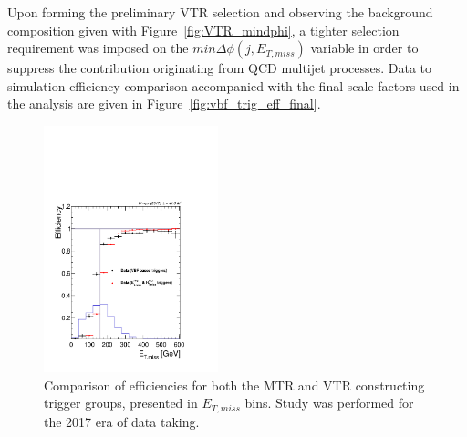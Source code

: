 \hspace{10pt} Upon forming the preliminary VTR selection and observing the background composition given with Figure~\ref{fig:VTR_mindphi}, a tighter selection requirement was imposed on the $min\Delta\phi(j, E_{T,miss})$ variable in order to suppress the contribution originating from QCD multijet processes. Data to simulation efficiency comparison accompanied with the final scale factors used in the analysis are given in Figure~\ref{fig:vbf_trig_eff_final}.

\begin{figure}[htbp]
  \centering
    \includegraphics[width=0.45\textwidth]{Analysis_strategy/VBF_eff/2017/MetNoMu_2017_comparison.pdf}
  \caption{Comparison of efficiencies for both the MTR and VTR constructing trigger groups, presented in $E_{T,miss}$ bins. Study was performed for the 2017 era of data taking.}
  \label{fig:vbf_metmht_comp}
\end{figure}

